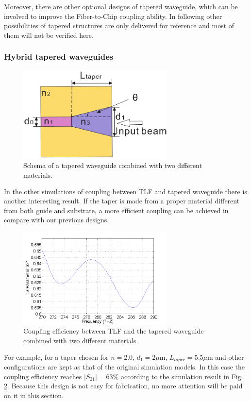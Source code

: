 Moreover, there are other optional designs of tapered waveguide, which can be involved to improve the Fiber-to-Chip coupling ability. In following other possibilities of tapered structures are only delivered for reference and most of them will not be verified here.   \\
\subsubsection*{Hybrid tapered waveguides}%
\begin{figure}[!ht]
\centering
\includegraphics[width=0.7\textwidth]{bilder/tapered_waveguide_others}
\caption{Schema of a tapered waveguide combined with two different materials.}
\label{fig:tapered_waveguide_others}
\end{figure} 
In the other simulations of coupling between TLF and tapered waveguide there is another interesting result. If the taper is made from a proper material different from both guide and substrate, a more efficient coupling can be achieved in compare with our previous designs.\\

\begin{figure}[!ht]
\centering
\includegraphics[width=0.7\textwidth]{bilder/s21_tapered_waveguide_others}
\caption{Coupling efficiency between TLF and the tapered waveguide combined with two different materials.}
\label{fig:tapered_waveguide_others_coupling}
\end{figure} 
For example, for a taper chosen for $n=2.0$, $d_{1}=2\mu$m, $L_{taper}=5.5\mu$m and other configurations are kept as that of the original simulation models. In this case the coupling efficiency reaches $|S_{21}|=63\%$ according to the simulation result in Fig. \ref{fig:tapered_waveguide_others_coupling}.  Because this design is not easy for fabrication, no more attention will be paid on it in this section.\\
   
